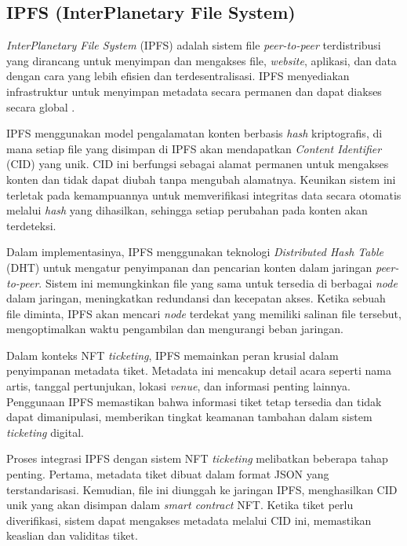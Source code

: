 \subsection{IPFS (InterPlanetary File System)}
\textit{InterPlanetary File System} (IPFS) adalah sistem file \textit{peer-to-peer} terdistribusi yang dirancang untuk menyimpan dan mengakses file, \textit{website}, aplikasi, dan data dengan cara yang lebih efisien dan terdesentralisasi. IPFS menyediakan infrastruktur untuk menyimpan metadata secara permanen dan dapat diakses secara global \parencite{ref12}.

IPFS menggunakan model pengalamatan konten berbasis \textit{hash} kriptografis, di mana setiap file yang disimpan di IPFS akan mendapatkan \textit{Content Identifier} (CID) yang unik. CID ini berfungsi sebagai alamat permanen untuk mengakses konten dan tidak dapat diubah tanpa mengubah alamatnya. Keunikan sistem ini terletak pada kemampuannya untuk memverifikasi integritas data secara otomatis melalui \textit{hash} yang dihasilkan, sehingga setiap perubahan pada konten akan terdeteksi.

Dalam implementasinya, IPFS menggunakan teknologi \textit{Distributed Hash Table} (DHT) untuk mengatur penyimpanan dan pencarian konten dalam jaringan \textit{peer-to-peer}. Sistem ini memungkinkan file yang sama untuk tersedia di berbagai \textit{node} dalam jaringan, meningkatkan redundansi dan kecepatan akses. Ketika sebuah file diminta, IPFS akan mencari \textit{node} terdekat yang memiliki salinan file tersebut, mengoptimalkan waktu pengambilan dan mengurangi beban jaringan.

Dalam konteks NFT \textit{ticketing}, IPFS memainkan peran krusial dalam penyimpanan metadata tiket. Metadata ini mencakup detail acara seperti nama artis, tanggal pertunjukan, lokasi \textit{venue}, dan informasi penting lainnya. Penggunaan IPFS memastikan bahwa informasi tiket tetap tersedia dan tidak dapat dimanipulasi, memberikan tingkat keamanan tambahan dalam sistem \textit{ticketing} digital.

Proses integrasi IPFS dengan sistem NFT \textit{ticketing} melibatkan beberapa tahap penting. Pertama, metadata tiket dibuat dalam format JSON yang terstandarisasi. Kemudian, file ini diunggah ke jaringan IPFS, menghasilkan CID unik yang akan disimpan dalam \textit{smart contract} NFT. Ketika tiket perlu diverifikasi, sistem dapat mengakses metadata melalui CID ini, memastikan keaslian dan validitas tiket.

